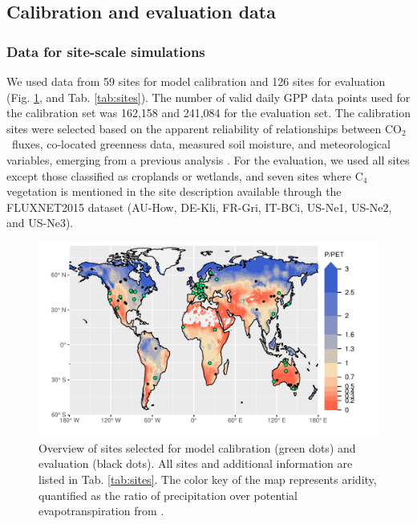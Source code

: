 \documentclass[gmd, manuscript]{copernicus}
\newcommand{\coo}{CO$_2$}
\begin{document}
\subsection{Calibration and evaluation data}

\label{sec:calibdata}

\subsubsection{Data for site-scale simulations}

We used data from 59 sites for model calibration and 126 sites for evaluation (Fig. \ref{fig:map_sites}, and Tab. \ref{tab:sites}). The number of valid daily GPP data points used for the calibration set was 162,158 and 241,084 for the evaluation set. The calibration sites were selected based on the apparent reliability of relationships between \coo\ fluxes, co-located greenness data, measured soil moisture, and meteorological variables, emerging from a previous analysis \citep{stocker18newphyt}. For the evaluation, we used all sites except those classified as croplands or wetlands, and seven sites where C$_4$ vegetation is mentioned in the site description available through the FLUXNET2015 dataset (AU-How, DE-Kli, FR-Gri, IT-BCi, US-Ne1, US-Ne2, and US-Ne3).

\begin{figure}[t]
    \centering
    \includegraphics[width=12cm]{fig/map_sites.pdf}
    \caption{Overview of sites selected for model calibration (green dots) and evaluation (black dots). All sites and additional information are listed in Tab. \ref{tab:sites}. The color key of the map represents aridity, quantified as the ratio of precipitation over potential evapotranspiration from \citet{greve14}.}
    \label{fig:map_sites}
\end{figure}
\end{document}

